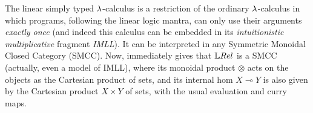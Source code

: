 The linear simply typed $\lambda$-calculus is a restriction of the ordinary $\lambda$-calculus in which programs, following the linear logic mantra, can only use their arguments \emph{exactly once} (and indeed this calculus can be embedded in its \emph{intuitionistic multiplicative} fragment \emph{IMLL}).
It can be interpreted in any Symmetric Monoidal Closed Category (SMCC).
Now, \cite[Section III.A]{Manzo2013} immediately gives that $\LREL$ is a SMCC (actually, even a model of IMLL), where its monoidal product $\otimes$ acts on the objects as the Cartesian product of sets, %
 and its internal hom $X\multimap Y$ is also given by the Cartesian product $X\times Y$ of sets, with the usual evaluation and curry maps.

